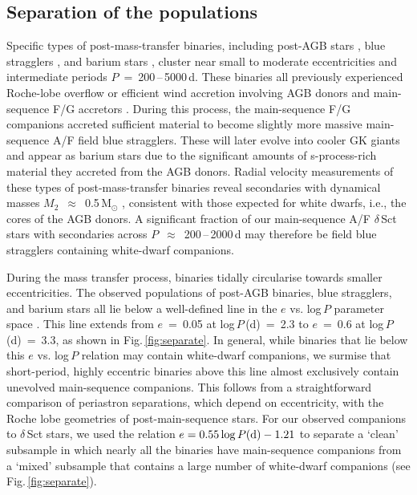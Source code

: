 \documentclass[a4paper,fleqn,usenatbib]{mnras}
\begin{document}
\subsection{Separation of the populations}
\label{ssec:sep_pop}

Specific types of post-mass-transfer binaries, including post-AGB stars \citep{vanwinckel2003}, blue stragglers \citep{geller&mathieu2011}, and barium stars \citep{boffin&jorissen1988,jorissenetal1998,vanderswaelmenetal2017}, cluster near small to moderate eccentricities and intermediate periods $P$~=~200\,--\,5000\,d. These binaries all previously experienced Roche-lobe overflow or efficient wind accretion involving AGB donors and main-sequence F/G accretors \citep{karakasetal2000}.  During this process, the main-sequence F/G companions accreted sufficient material to become slightly more massive main-sequence A/F field blue stragglers.  These will later evolve into cooler GK giants and appear as barium stars due to the significant amounts of s-process-rich material they accreted from the AGB donors.  Radial velocity measurements of these types of post-mass-transfer binaries reveal secondaries with dynamical masses $M_2$~$\approx$~0.5\,M$_{\odot}$ \citep{jorissenetal1998,vanwinckel2003,geller&mathieu2011}, consistent with those expected for white dwarfs, i.e., the cores of the AGB donors.  A significant fraction of our main-sequence A/F $\delta$\,Sct stars with secondaries across $P$~$\approx$~200\,--\,2000\,d may therefore be field blue stragglers containing white-dwarf companions.  

During the mass transfer process, binaries tidally circularise towards smaller eccentricities.  The observed populations of post-AGB binaries, blue stragglers, and barium stars all lie below a well-defined line in the $e$ vs. log\,$P$ parameter space \citep{jorissenetal1998,vanwinckel2003,geller&mathieu2011}.  This line extends from $e$~=~0.05 at log\,$P$\,(d)~=~2.3 to $e$~=~0.6 at log\,$P$\,(d)~=~3.3, as shown in Fig.\,\ref{fig:separate}.  In general, while binaries that lie below this $e$ vs. log\,$P$ relation may contain white-dwarf companions, we surmise that short-period, highly eccentric binaries above this line almost exclusively contain unevolved main-sequence companions. This follows from a straightforward comparison of periastron separations, which depend on eccentricity, with the Roche lobe geometries of post-main-sequence stars. For our observed companions to $\delta$\,Sct stars, we used the relation $e = 0.55 \log P ({\rm d}) - 1.21$ to separate a `clean' subsample in which nearly all the binaries have main-sequence companions from a `mixed' subsample that contains a large number of white-dwarf companions (see Fig.\,\ref{fig:separate}). 
\end{document}
